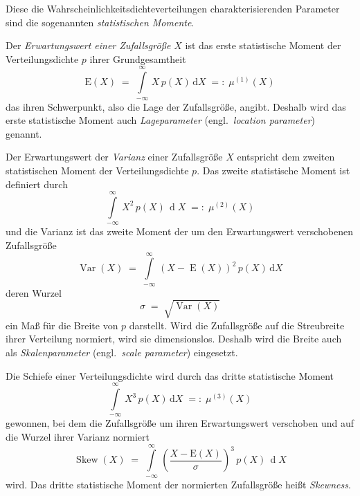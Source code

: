 Diese die Wahrscheinlichkeitsdichteverteilungen charakterisierenden Parameter sind die
sogenannten \textsl{statistischen Momente}.

Der \textsl{Erwartungswert einer Zufallsgröße} $X$ ist das erste statistische Moment
der Verteilungsdichte $p$ ihrer Grundgesamtheit
\begin{equation}
\mathrm{E}(X) \; = \; \int\limits_{-\infty}^{\infty} \, X \, p(X) \, \mathrm{d} X \; =: \; \mu^{(1)}(X)
\end{equation}
das ihren Schwerpunkt, also die Lage der Zufallsgröße, angibt. Deshalb wird das erste
statistische Moment auch \textsl{Lageparameter} (engl.\ \textsl{location parameter}) genannt.

Der Erwartungswert der \textsl{Varianz}
einer Zufallsgröße $X$ entspricht dem zweiten statistischen Moment
der Verteilungsdichte $p$.
Das zweite statistische Moment ist definiert durch
\begin{equation}
\int\limits_{-\infty}^{\infty} \, X^2 \, p(X) \, \operatorname{d} X \; =: \; \mu^{(2)}(X)
\end{equation}
und die Varianz ist das zweite Moment der um den Erwartungswert verschobenen Zufallsgröße
\begin{equation}
\operatorname{Var}(X) \; = \; \int\limits_{-\infty}^{\infty} \, (X - \operatorname{E}(X))^2 \,
 p(X) \, \mathrm{d} X
\end{equation}
deren Wurzel
\begin{equation}
\sigma \; = \; \sqrt{\operatorname{Var}(X)}
\end{equation}
ein Maß für die Breite von $p$ darstellt. Wird die Zufallsgröße auf die Streubreite ihrer
Verteilung normiert, wird sie dimensionslos. Deshalb wird die Breite auch als \textsl{Skalenparameter}
(engl.\ \textsl{scale parameter}) eingesetzt.

Die Schiefe einer Verteilungsdichte wird durch das dritte statistische Moment
\begin{equation}
\int\limits_{-\infty}^{\infty} \, X^3 \, p(X) \, \mathrm{d} X \; =: \; \mu^{(3)}(X)
\end{equation}
gewonnen, bei dem die Zufallsgröße um ihren Erwartungswert verschoben und auf die Wurzel ihrer
Varianz normiert
\begin{equation}
\operatorname{Skew}(X) \; = \; \int\limits_{-\infty}^{\infty} \, \left(\frac{X - \mathrm{E}(X)}{\sigma}
\right)^3 \, p(X) \, \operatorname{d} X
\end{equation}
wird. Das dritte statistische Moment der normierten Zufallsgröße heißt
\textsl{Skewness}.

